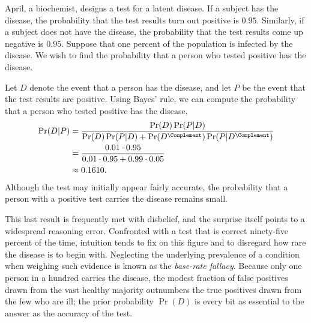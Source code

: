 \begin{example}
April, a biochemist, designs a test for a latent disease.
If a subject has the disease, the probability that the test results turn out positive is $0.95$.
Similarly, if a subject does not have the disease, the probability that the test results come up negative is $0.95$.
Suppose that one percent of the population is infected by the disease.
We wish to find the probability that a person who tested positive has the disease.

Let $D$ denote the event that a person has the disease, and let $P$ be the event that the test results are positive.
Using Bayes' rule, we can compute the probability that a person who tested positive has the disease,
\begin{equation*}
\begin{split}
\Pr (D|P)
&= \frac{ \Pr(D) \Pr(P|D) }{ \Pr(D) \Pr(P|D) + \Pr(D^{\Complement}) \Pr(P|D^{\Complement}) } \\
&= \frac{ 0.01 \cdot 0.95 }{ 0.01 \cdot 0.95 + 0.99 \cdot 0.05 } \\
&\approx 0.1610 .
\end{split}
\end{equation*}
Although the test may initially appear fairly accurate, the probability that a person with a positive test carries the disease remains small.
\end{example}

This last result is frequently met with disbelief, and the surprise itself points to a widespread reasoning error.
Confronted with a test that is correct ninety-five percent of the time, intuition tends to fix on this figure and to disregard how rare the disease is to begin with.
Neglecting the underlying prevalence of a condition when weighing such evidence is known as the \emph{base-rate fallacy}.
Because only one person in a hundred carries the disease, the modest fraction of false positives drawn from the vast healthy majority outnumbers the true positives drawn from the few who are ill;
the prior probability $\Pr (D)$ is every bit as essential to the answer as the accuracy of the test.

